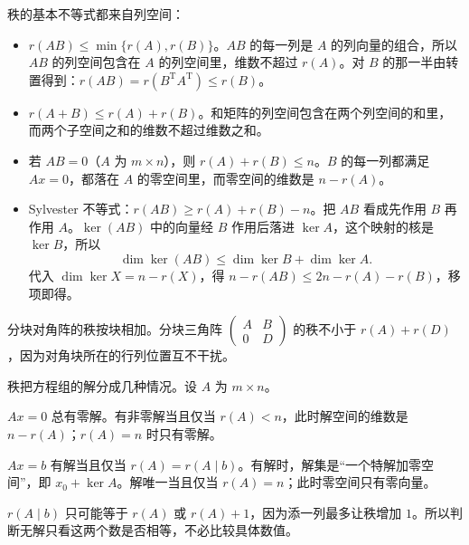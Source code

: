秩的基本不等式都来自列空间：
\begin{itemize}
\item \(r(AB)\le\min\{r(A),r(B)\}\)。\(AB\) 的每一列是 \(A\) 的列向量的组合，所以 \(AB\) 的列空间包含在 \(A\) 的列空间里，维数不超过 \(r(A)\)。对 \(B\) 的那一半由转置得到：\(r(AB)=r(B^{\mathrm T}A^{\mathrm T})\le r(B)\)。
\item \(r(A+B)\le r(A)+r(B)\)。和矩阵的列空间包含在两个列空间的和里，而两个子空间之和的维数不超过维数之和。
\item 若 \(AB=0\)（\(A\) 为 \(m\times n\)），则 \(r(A)+r(B)\le n\)。\(B\) 的每一列都满足 \(Ax=0\)，都落在 \(A\) 的零空间里，而零空间的维数是 \(n-r(A)\)。
\item Sylvester 不等式：\(r(AB)\ge r(A)+r(B)-n\)。把 \(AB\) 看成先作用 \(B\) 再作用 \(A\)。\(\ker(AB)\) 中的向量经 \(B\) 作用后落进 \(\ker A\)，这个映射的核是 \(\ker B\)，所以
\[
\dim\ker(AB)\le\dim\ker B+\dim\ker A.
\]
代入 \(\dim\ker X=n-r(X)\)，得 \(n-r(AB)\le 2n-r(A)-r(B)\)，移项即得。
\end{itemize}

分块对角阵的秩按块相加。分块三角阵 \(\begin{pmatrix}A&B\\0&D\end{pmatrix}\) 的秩不小于 \(r(A)+r(D)\)，因为对角块所在的行列位置互不干扰。

秩把方程组的解分成几种情况。设 \(A\) 为 \(m\times n\)。

\(Ax=0\) 总有零解。有非零解当且仅当 \(r(A)<n\)，此时解空间的维数是 \(n-r(A)\)；\(r(A)=n\) 时只有零解。

\(Ax=b\) 有解当且仅当 \(r(A)=r(A\mid b)\)。有解时，解集是“一个特解加零空间”，即 \(x_0+\ker A\)。解唯一当且仅当 \(r(A)=n\)；此时零空间只有零向量。

\(r(A\mid b)\) 只可能等于 \(r(A)\) 或 \(r(A)+1\)，因为添一列最多让秩增加 \(1\)。所以判断无解只看这两个数是否相等，不必比较具体数值。

